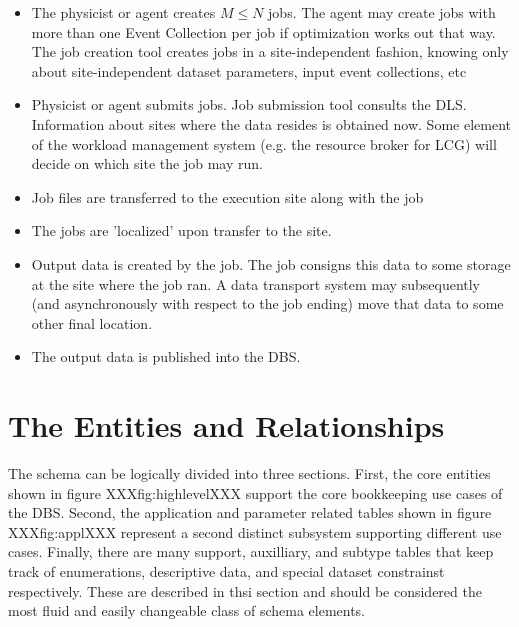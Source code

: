 \documentclass[pdftex]{cmspaper}
\begin{document}
{\begin{itemize}
\item The physicist or agent creates $M \le N$ jobs.  The agent may create 
      jobs with more than one Event Collection per job if optimization 
      works out that way.  The job creation tool creates jobs in a 
      site-independent fashion, knowing only about site-independent dataset 
      parameters, input event collections, etc 

\item Physicist or agent submits jobs. Job submission tool consults the DLS. 
      Information about sites where the data resides is obtained now. Some
      element of the workload management system (e.g. the resource broker
      for LCG) will decide on which site the job may run.

\item Job files are transferred to the execution site along with the job 

\item The jobs are 'localized' upon transfer to the site. 

\item Output data is created by the job. The job consigns this data to
      some storage at the site where the job ran. A data transport system
      may subsequently (and asynchronously with respect to the job ending)
      move that data to some other final location.

\item The output data is published into the DBS.

\end{itemize}




\section{The Entities and Relationships}
\label{sec:details}

The schema can be logically divided into three sections.  First,
the core entities shown in figure XXXfig:highlevelXXX support the
core bookkeeping use cases of the DBS.   Second, the application and
parameter related tables shown in figure XXXfig:applXXX represent a second
distinct subsystem supporting different use cases. Finally, there are many
support, auxilliary, and subtype tables that keep track of enumerations,
descriptive data, and special dataset constrainst respectively.  These are
described in thsi section and should be considered the most fluid and
easily changeable class of schema elements.

}
\end{document}
